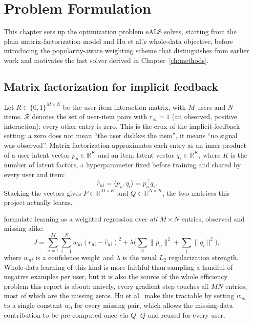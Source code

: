 \chapter{Problem Formulation}
\label{ch:formulation}

This chapter sets up the optimization problem eALS solves, starting from
the plain matrix-factorization model and Hu et al.'s whole-data objective,
before introducing the popularity-aware weighting scheme that
distinguishes \citet{he2016eals} from earlier work and motivates the fast
solver derived in Chapter~\ref{ch:methods}.

\section{Matrix factorization for implicit feedback}

Let $R \in \{0,1\}^{M\times N}$ be the user-item interaction matrix, with
$M$ users and $N$ items. $\mathcal{R}$ denotes the set of user-item pairs
with $r_{ui}=1$ (an observed, positive interaction); every other entry is
zero. This is the crux of the implicit-feedback setting: a zero does not
mean ``the user dislikes the item'', it means ``no signal was observed''.
Matrix factorization approximates each entry as an inner
product of a user latent vector $p_u \in \mathbb{R}^K$ and an item latent
vector $q_i \in \mathbb{R}^K$, where $K$ is the number of latent factors, a
hyperparameter fixed before training and shared by every user and item:
\[
  \hat{r}_{ui} = \langle p_u, q_i \rangle = p_u^\top q_i .
\]
Stacking the vectors gives $P \in \mathbb{R}^{M\times K}$ and
$Q \in \mathbb{R}^{N\times K}$, the two matrices this project actually
learns.

\medskip
\citet{hu2008implicit} formulate learning as a weighted regression over
\emph{all} $M\times N$ entries, observed and missing alike:
\[
  J = \sum_{u=1}^{M}\sum_{i=1}^{N} w_{ui}(r_{ui}-\hat r_{ui})^2
      + \lambda\Big(\sum_u \lVert p_u\rVert^2 + \sum_i \lVert q_i\rVert^2\Big),
\]
where $w_{ui}$ is a confidence weight and $\lambda$ is the usual $L_2$
regularization strength. Whole-data learning of this kind is more faithful
than sampling a handful of negative examples per user, but it is also the
source of the whole efficiency problem this report is about: naively, every
gradient step touches all $MN$ entries, most of which are the missing
zeros. Hu et al.\ make this tractable by setting $w_{ui}$ to a single
constant $w_0$ for every missing pair, which allows the missing-data
contribution to be pre-computed once via $Q^\top Q$ and reused for every
user.

